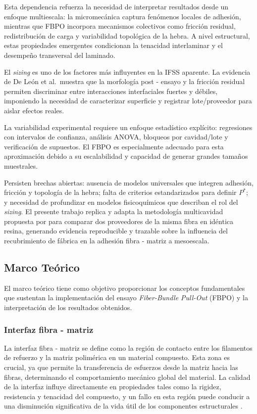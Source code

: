 Esta dependencia refuerza la necesidad de interpretar resultados desde un enfoque multiescala: la
micromecánica captura fenómenos locales de adhesión, mientras que FBPO incorpora mecanismos colectivos
como fricción residual, redistribución de carga y variabilidad topológica de la hebra. A nivel estructural,
estas propiedades emergentes condicionan la tenacidad interlaminar y el desempeño transversal del
laminado.

El \textit{sizing} es uno de los factores más influyentes en la IFSS aparente. La evidencia de De León
et al.\ muestra que la morfología post - ensayo y la fricción residual permiten discriminar entre
interacciones interfaciales fuertes y débiles, imponiendo la necesidad de caracterizar superficie y
registrar lote/proveedor para aislar efectos reales.

La variabilidad experimental requiere un enfoque estadístico explícito: regresiones con intervalos de
confianza, análisis ANOVA, bloqueos por cavidad/lote y verificación de supuestos. El FBPO es especialmente
adecuado para esta aproximación debido a su escalabilidad y capacidad de generar grandes tamaños
muestrales.

Persisten brechas abiertas: ausencia de modelos universales que integren adhesión, fricción y topología
de la hebra; falta de criterios estandarizados para definir \(P^{\ast}\); y necesidad de profundizar en
modelos fisicoquímicos que describan el rol del \textit{sizing}. El presente trabajo replica y adapta la
metodología multicavidad propuesta por \cite{DeLeon2022} para comparar dos proveedores de la misma fibra
en idéntica resina, generando evidencia reproducible y trazable sobre la influencia del recubrimiento de
fábrica en la adhesión fibra - matriz a mesoescala.


\subsection{Marco Teórico}

El marco teórico tiene como objetivo proporcionar los conceptos fundamentales que sustentan la
implementación del ensayo \textit{Fiber-Bundle Pull-Out} (FBPO) y la interpretación de los
resultados obtenidos.

\subsubsection{Interfaz fibra - matriz}
La interfaz fibra - matriz se define como la región de contacto entre los filamentos de refuerzo y
la matriz polimérica en un material compuesto. Esta zona es crucial, ya que permite la transferencia
de esfuerzos desde la matriz hacia las fibras, determinando el comportamiento mecánico global del
material. La calidad de la interfaz influye directamente en propiedades tales como la rigidez,
resistencia y tenacidad del compuesto, y un fallo en esta región puede conducir a una disminución
significativa de la vida útil de los componentes estructurales
\cite{HullClyne1996, KellyZweben2000}.

